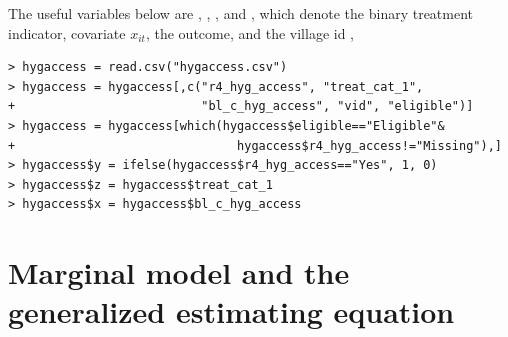The useful variables below are , , , and , which denote the binary treatment indicator, covariate $x_{it}$, the outcome, and the village id , 
\begin{lstlisting}
> hygaccess = read.csv("hygaccess.csv")
> hygaccess = hygaccess[,c("r4_hyg_access", "treat_cat_1", 
+                          "bl_c_hyg_access", "vid", "eligible")]
> hygaccess = hygaccess[which(hygaccess$eligible=="Eligible"&
+                               hygaccess$r4_hyg_access!="Missing"),]
> hygaccess$y = ifelse(hygaccess$r4_hyg_access=="Yes", 1, 0)
> hygaccess$z = hygaccess$treat_cat_1
> hygaccess$x = hygaccess$bl_c_hyg_access
\end{lstlisting}



\section{Marginal model and the generalized estimating equation}

